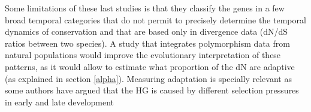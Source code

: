 Some limitations of these last studies is that they classify the genes in a few broad temporal categories that do not permit to precisely determine the temporal dynamics of conservation and that are based only in divergence data (dN/dS ratios between two species).
A study that integrates polymorphism data from natural populations would improve the evolutionary interpretation of these patterns, as it would allow to estimate what proportion of the dN are adaptive (as explained in section \ref{alpha}).
Measuring adaptation is specially relevant as some authors have argued that the HG is caused by different selection pressures in early and late development \citep{Slack1993,Kalinka2012,Wray2000}


